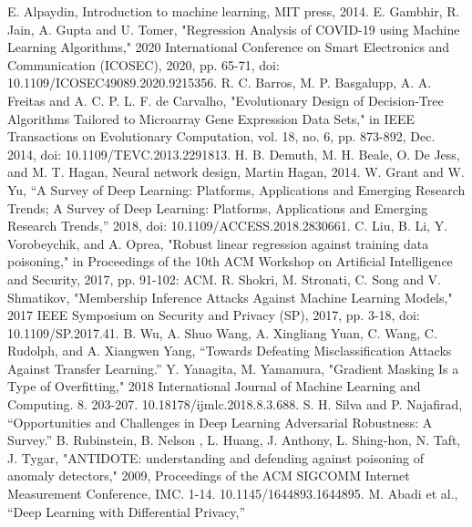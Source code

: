 \documentclass[11pt,conference]{IEEEtran}
\begin{document}
\begin{thebibliography}{00}
     E. Alpaydin, Introduction to machine learning, MIT press,
        2014.
     E. Gambhir, R. Jain, A. Gupta and U. Tomer, "Regression
        Analysis of COVID-19 using Machine Learning Algorithms," 2020
        International Conference on Smart Electronics and Communication
        (ICOSEC), 2020, pp. 65-71, doi: 10.1109/ICOSEC49089.2020.9215356.
     R. C. Barros, M. P. Basgalupp, A. A. Freitas and A. C. P. L.
        F. de Carvalho, "Evolutionary Design of Decision-Tree Algorithms
        Tailored to Microarray Gene Expression Data Sets," in IEEE Transactions
        on Evolutionary Computation, vol. 18, no. 6, pp. 873-892, Dec. 2014,
        doi: 10.1109/TEVC.2013.2291813.
     H. B. Demuth, M. H. Beale, O. De Jess, and M. T.
        Hagan, Neural network design, Martin Hagan, 2014.
     W. Grant and W. Yu, “A Survey of Deep Learning: Platforms,
        Applications and Emerging Research Trends; A Survey of Deep Learning:
        Platforms, Applications and Emerging Research Trends,” 2018, doi:
        10.1109/ACCESS.2018.2830661.
     C. Liu, B. Li, Y. Vorobeychik, and A. Oprea, "Robust linear
        regression against  training  data  poisoning,"  in Proceedings  of
        the  10th  ACM Workshop  on  Artificial  Intelligence  and  Security,
        2017,  pp.  91-102: ACM.
     R. Shokri, M. Stronati, C. Song and V. Shmatikov, "Membership
        Inference Attacks Against Machine Learning Models," 2017 IEEE Symposium
        on Security and Privacy (SP), 2017, pp. 3-18, doi: 10.1109/SP.2017.41.
     B. Wu, A. Shuo Wang, A. Xingliang Yuan, C. Wang, C.
        Rudolph, and A. Xiangwen Yang, “Towards Defeating Misclassification
        Attacks Against Transfer Learning.”
     Y. Yanagita, M. Yamamura, "Gradient
        Masking Is a Type of Overfitting," 2018 International Journal of Machine
        Learning and Computing. 8. 203-207. 10.18178/ijmlc.2018.8.3.688.
     S. H. Silva and P. Najafirad, “Opportunities and
        Challenges in Deep Learning Adversarial Robustness: A Survey.”
     B. Rubinstein, B. Nelson , L. Huang, J. Anthony, L.
        Shing-hon, N. Taft, J. Tygar, "ANTIDOTE:
        understanding and defending against poisoning of anomaly detectors,"
        2009, Proceedings of the ACM SIGCOMM Internet Measurement Conference, IMC.
        1-14. 10.1145/1644893.1644895. 
     M. Abadi et al., “Deep Learning with Differential Privacy,”

\end{thebibliography}
\end{document}
